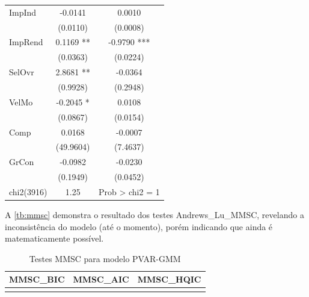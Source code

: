 \documentclass[
  12pt,
  12pt,
  openright,
  oneside,
  a4paper,
  chapter=TITLE,
  section=TITLE,
  subsection=TITLE,
  subsubsection=TITLE,
  english,
  portugues,
  sumario=tradicional]{abntex2}
\begin{document}
\begin{longtable}[]{@{}lcc@{}}
ImpInd & -0.0141 & 0.0010 \\
& (0.0110) & (0.0008) \\
ImpRend & 0.1169 ** & -0.9790 *** \\
& (0.0363) & (0.0224) \\
SelOvr & 2.8681 ** & -0.0364 \\
& (0.9928) & (0.2948) \\
VelMo & -0.2045 * & 0.0108 \\
& (0.0867) & (0.0154) \\
Comp & 0.0168 & -0.0007 \\
& (49.9604) & (7.4637) \\
GrCon & -0.0982 & -0.0230 \\
& (0.1949) & (0.0452) \\
chi2(3916) & 1.25 & Prob \textgreater{} chi2 = 1 \\
\bottomrule
\end{longtable}

\vspace{1mm}

\label{tb:pvargmm}
\vspace{-2mm}
\vspace{20pt}

\parindent 1.50cm

A \autoref{tb:mmsc} demonstra o resultado dos testes Andrews\_Lu\_MMSC, revelando a inconsistência do modelo (até o momento), porém indicando que ainda é matematicamente possível.

\vspace{20pt}

\begin{table}[!hbtp]
\caption{Testes MMSC para modelo PVAR-GMM}
\vspace{-1mm}
\begingroup\fontsize{10}{12}\selectfont

\begin{tabu} to 
\toprule
MMSC\_BIC & MMSC\_AIC & MMSC\_HQIC\\
\midrule
{} &  & \\
\bottomrule
\end{tabu}
\endgroup{}
\vspace{1mm}
\label{tb:mmsc}
\vspace{-2mm}
\end{table}
\end{document}
